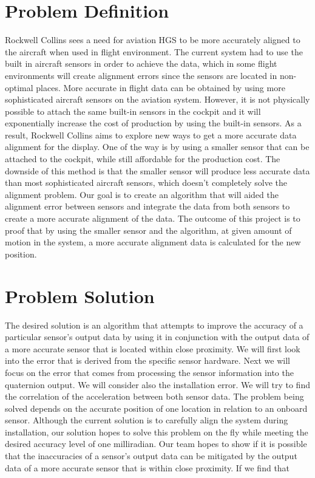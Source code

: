 \documentclass[letterpaper,10pt,titlepage]{article}
\begin{document}
\section*{Problem Definition}
Rockwell Collins sees a need for aviation HGS to be more accurately aligned to the aircraft when used in flight environment. The current system had to use the built in aircraft sensors in order to achieve the data, which in some flight environments will create alignment errors since the sensors are located in non-optimal places. More accurate in flight data can be obtained by using more sophisticated aircraft sensors on the aviation system. However, it is not physically possible to attach the same built-in sensors in the cockpit and it will exponentially increase the cost of production by using the built-in sensors. As a result, Rockwell Collins aims to explore new ways to get a more accurate data alignment for the display. One of the way is by using a smaller sensor that can be attached to the cockpit, while still affordable for the production cost. The downside of this method is that the smaller sensor will produce less accurate data than most sophisticated aircraft sensors, which doesn’t completely solve the alignment problem. Our goal is to create an algorithm that will aided the alignment error between sensors and integrate the data from both sensors to create a more accurate alignment of the data. The outcome of this project is to proof that by using the smaller sensor and the algorithm, at given amount of motion in the system, a more accurate alignment data is calculated for the new position.

\section*{Problem Solution}
The desired solution is an algorithm that attempts to improve the accuracy of a particular sensor’s output data by using it in conjunction with the output data of a more accurate sensor that is located within close proximity. We will first look into the error that is derived from the specific sensor hardware. Next we will focus on the error that comes from processing the sensor information into the quaternion output. We will consider also the installation error. We will try to find the correlation of the acceleration between both sensor data. The problem being solved depends on the accurate position of one location in relation to an onboard sensor. Although the current solution is to carefully align the system during installation, our solution hopes to solve this problem on the fly while meeting the desired accuracy level of one milliradian. Our team hopes to show if it is possible that the inaccuracies of a sensor's output data can be mitigated by the output data of a more accurate sensor that is within close proximity. If we find that 
\end{document}
